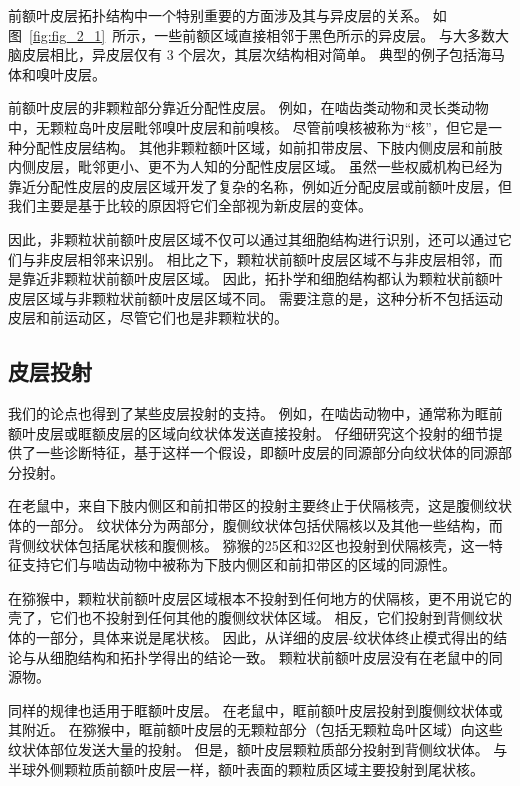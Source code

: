 前额叶皮层拓扑结构中一个特别重要的方面涉及其与异皮层的关系。
如图~\ref{fig:fig_2_1}~所示，一些前额区域直接相邻于黑色所示的异皮层。
与大多数大脑皮层相比，异皮层仅有 3 个层次，其层次结构相对简单。
典型的例子包括海马体和嗅叶皮层。


前额叶皮层的非颗粒部分靠近分配性皮层。
例如，在啮齿类动物和灵长类动物中，无颗粒岛叶皮层毗邻嗅叶皮层和前嗅核。
尽管前嗅核被称为“核”，但它是一种分配性皮层结构。
其他非颗粒额叶区域，如前扣带皮层、下肢内侧皮层和前肢内侧皮层，毗邻更小、更不为人知的分配性皮层区域。
虽然一些权威机构已经为靠近分配性皮层的皮层区域开发了复杂的名称，例如近分配皮层或前额叶皮层，但我们主要是基于比较的原因将它们全部视为新皮层的变体。


因此，非颗粒状前额叶皮层区域不仅可以通过其细胞结构进行识别，还可以通过它们与非皮层相邻来识别。
相比之下，颗粒状前额叶皮层区域不与非皮层相邻，而是靠近非颗粒状前额叶皮层区域。
因此，拓扑学和细胞结构都认为颗粒状前额叶皮层区域与非颗粒状前额叶皮层区域不同。
需要注意的是，这种分析不包括运动皮层和前运动区，尽管它们也是非颗粒状的。


\subsection{皮层投射}

我们的论点也得到了某些皮层投射的支持。
例如，在啮齿动物中，通常称为眶前额叶皮层或眶额皮层的区域向纹状体发送直接投射。
仔细研究这个投射的细节提供了一些诊断特征，基于这样一个假设，即额叶皮层的同源部分向纹状体的同源部分投射。


在老鼠中，来自下肢内侧区和前扣带区的投射主要终止于伏隔核壳，这是腹侧纹状体的一部分\cite{brog1993patterns,reynolds2005specificity}。
纹状体分为两部分，腹侧纹状体包括伏隔核以及其他一些结构，而背侧纹状体包括尾状核和腹侧核。
猕猴的25区和32区也投射到伏隔核壳\cite{haber1995orbital,haber2006reward}，这一特征支持它们与啮齿动物中被称为下肢内侧区和前扣带区的区域的同源性。


在猕猴中，颗粒状前额叶皮层区域根本不投射到任何地方的伏隔核，更不用说它的壳了，它们也不投射到任何其他的腹侧纹状体区域。
相反，它们投射到背侧纹状体的一部分，具体来说是尾状核\cite{selemon1985longitudinal}。
因此，从详细的皮层-纹状体终止模式得出的结论与从细胞结构和拓扑学得出的结论一致。
颗粒状前额叶皮层没有在老鼠中的同源物。


同样的规律也适用于眶额叶皮层。
在老鼠中，眶前额叶皮层投射到腹侧纹状体或其附近\cite{berendse1992topographical}。
在猕猴中，眶前额叶皮层的无颗粒部分（包括无颗粒岛叶区域）向这些纹状体部位发送大量的投射。
但是，额叶皮层颗粒质部分投射到背侧纹状体。
与半球外侧颗粒质前额叶皮层一样，额叶表面的颗粒质区域主要投射到尾状核\cite{haber1995orbital,haber2006reward,ferry2000prefrontal,ongur2000organization}。



